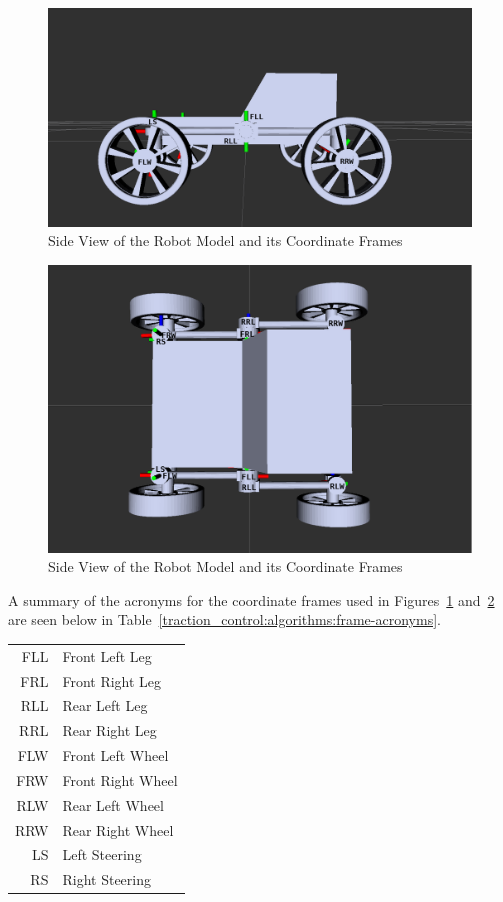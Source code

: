 \begin{figure}[H]
	\centering
	\includegraphics[width=.9\textwidth]{sections/algorithms/images/srr_side.png}
	\caption{Side View of the Robot Model and its Coordinate Frames}
	\label{traction_control:algorithms:coordinates-side}
\end{figure}
 
\begin{figure}[H]
	\centering
	\includegraphics[width=.9\textwidth]{sections/algorithms/images/srr_top.png}
	\caption{Side View of the Robot Model and its Coordinate Frames}
	\label{traction_control:algorithms:coordinates-top}
\end{figure}
 
A summary of the acronyms for the coordinate frames used in Figures~\ref{traction_control:algorithms:coordinates-side} and~\ref{traction_control:algorithms:coordinates-top} are seen below in Table~\ref{traction_control:algorithms:frame-acronyms}.
\begin{center}\label{traction_control:algorithms:frame-acronyms}
	\begin{tabular}{rl}
		FLL & Front Left Leg \\
		FRL & Front Right Leg \\
		RLL & Rear Left Leg \\
		RRL & Rear Right Leg \\
		FLW & Front Left Wheel \\
		FRW & Front Right Wheel \\
		RLW & Rear Left Wheel \\
		RRW & Rear Right Wheel \\
		LS  & Left Steering \\
		RS  & Right Steering
	\end{tabular}
\end{center}

